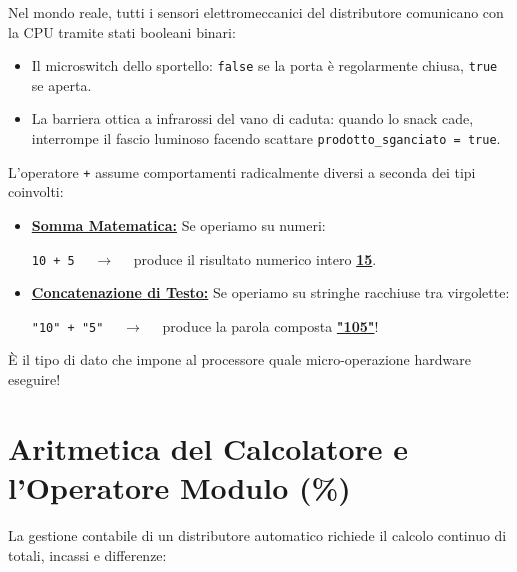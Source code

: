 \begin{concetto}
Nel mondo reale, tutti i sensori elettromeccanici del distributore comunicano con la CPU tramite stati booleani binari:
\begin{itemize}
  \item Il microswitch dello sportello: \texttt{false} se la porta è regolarmente chiusa, \texttt{true} se aperta.
  \item La barriera ottica a infrarossi del vano di caduta: quando lo snack cade, interrompe il fascio luminoso facendo scattare \texttt{prodotto\_sganciato = true}.
\end{itemize}
\end{concetto}

\begin{attenzione}
L'operatore \texttt{+} assume comportamenti radicalmente diversi a seconda dei tipi coinvolti:
\begin{itemize}
  \item \textbf{\underline{Somma Matematica:}} Se operiamo su numeri:
  \begin{center}
  \texttt{10 + 5} $\quad\longrightarrow\quad$ produce il risultato numerico intero \textbf{\underline{15}}.
  \end{center}
  \item \textbf{\underline{Concatenazione di Testo:}} Se operiamo su stringhe racchiuse tra virgolette:
  \begin{center}
  \texttt{"10" + "5"} $\quad\longrightarrow\quad$ produce la parola composta \textbf{\underline{"105"}}!
  \end{center}
\end{itemize}
È il tipo di dato che impone al processore quale micro-operazione hardware eseguire!
\end{attenzione}

\section{Aritmetica del Calcolatore e l'Operatore Modulo (\%)}

La gestione contabile di un distributore automatico richiede il calcolo continuo di totali, incassi e differenze:

